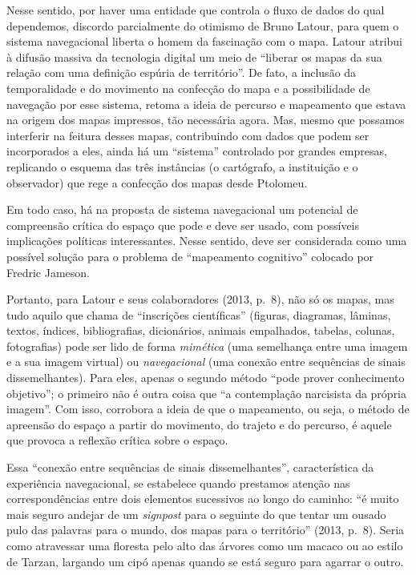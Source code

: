 Nesse sentido, por haver uma entidade que controla o fluxo de dados do
qual dependemos, discordo parcialmente do otimismo de Bruno Latour, para
quem o sistema navegacional liberta o homem da fascinação com o mapa.
Latour atribui à difusão massiva da tecnologia digital um meio de
``liberar os mapas da sua relação com uma definição espúria de
território''. De fato, a inclusão da temporalidade e do movimento na
confecção do mapa e a possibilidade de navegação por esse sistema,
retoma a ideia de percurso e mapeamento que estava na origem dos mapas
impressos, tão necessária agora. Mas, mesmo que possamos interferir na
feitura desses mapas, contribuindo com dados que podem ser incorporados
a eles, ainda há um ``sistema'' controlado por grandes empresas,
replicando o esquema das três instâncias (o cartógrafo, a instituição e
o observador) que rege a confecção dos mapas desde Ptolomeu.

Em todo caso, há na proposta de sistema navegacional um potencial de
compreensão crítica do espaço que pode e deve ser usado, com possíveis
implicações políticas interessantes. Nesse sentido, deve ser considerada
como uma possível solução para o problema de ``mapeamento cognitivo''
colocado por Fredric Jameson.

Portanto, para Latour e seus colaboradores (2013, p.~8), não só os
mapas, mas tudo aquilo que chama de ``inscrições científicas'' (figuras,
diagramas, lâminas, textos, índices, bibliografias, dicionários, animais
empalhados, tabelas, colunas, fotografias) pode ser lido de forma
\emph{mimética} (uma semelhança entre uma imagem e a sua imagem virtual)
ou \emph{navegacional} (uma conexão entre sequências de sinais
dissemelhantes). Para eles, apenas o segundo método ``pode prover
conhecimento objetivo''; o primeiro não é outra coisa que ``a
contemplação narcisista da própria imagem''. Com isso, corrobora a ideia
de que o mapeamento, ou seja, o método de apreensão do espaço a partir
do movimento, do trajeto e do percurso, é aquele que provoca a reflexão
crítica sobre o espaço.

Essa ``conexão entre sequências de sinais dissemelhantes'',
característica da experiência navegacional, se estabelece quando
prestamos atenção nas correspondências entre dois elementos sucessivos
ao longo do caminho: ``é muito mais seguro andejar de um \emph{signpost}
para o seguinte do que tentar um ousado pulo das palavras para o mundo,
dos mapas para o território'' (2013, p.~8). Seria como atravessar uma
floresta pelo alto das árvores como um macaco ou ao estilo de Tarzan,
largando um cipó apenas quando se está seguro para agarrar o outro.

